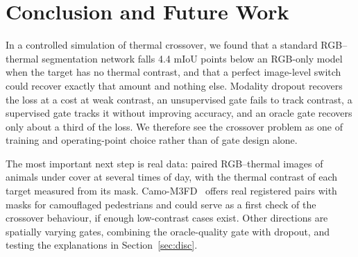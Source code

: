 \documentclass[runningheads]{llncs}
\begin{document}
\section{Conclusion and Future Work}
In a controlled simulation of thermal crossover, we found that a standard RGB--thermal segmentation network falls 4.4 mIoU points below an RGB-only model when the target has no thermal contrast, and that a perfect image-level switch could recover exactly that amount and nothing else. Modality dropout recovers the loss at a cost at weak contrast, an unsupervised gate fails to track contrast, a supervised gate tracks it without improving accuracy, and an oracle gate recovers only about a third of the loss. We therefore see the crossover problem as one of training and operating-point choice rather than of gate design alone.

The most important next step is real data: paired RGB--thermal images of animals under cover at several times of day, with the thermal contrast of each target measured from its mask. Camo-M3FD~\cite{camom3fd} offers real registered pairs with masks for camouflaged pedestrians and could serve as a first check of the crossover behaviour, if enough low-contrast cases exist. Other directions are spatially varying gates, combining the oracle-quality gate with dropout, and testing the explanations in Section~\ref{sec:disc}.
\end{document}
